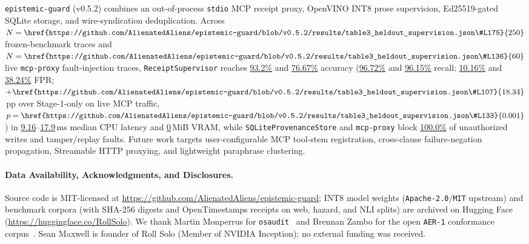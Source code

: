 \documentclass[10pt,twocolumn]{article}
\begin{document}
\texttt{epistemic-guard} (v0.5.2) combines an out-of-process \texttt{stdio} MCP receipt proxy, OpenVINO INT8 prose supervision, Ed25519-gated SQLite storage, and wire-syndication deduplication. Across $N=\href{https://github.com/AlienatedAliens/epistemic-guard/blob/v0.5.2/results/table3_heldout_supervision.json\#L175}{250}$ frozen-benchmark traces and $N=\href{https://github.com/AlienatedAliens/epistemic-guard/blob/v0.5.2/results/table3_heldout_supervision.json\#L136}{60}$ live \texttt{mcp-proxy} fault-injection traces, \texttt{ReceiptSupervisor} reaches \href{https://github.com/AlienatedAliens/epistemic-guard/blob/v0.5.2/results/table3_heldout_supervision.json\#L71}{93.2\%} and \href{https://github.com/AlienatedAliens/epistemic-guard/blob/v0.5.2/results/table3_heldout_supervision.json\#L108}{76.67\%} accuracy (\href{https://github.com/AlienatedAliens/epistemic-guard/blob/v0.5.2/results/table3_heldout_supervision.json\#L96}{96.72\%} and \href{https://github.com/AlienatedAliens/epistemic-guard/blob/v0.5.2/results/table3_heldout_supervision.json\#L121}{96.15\%} recall; \href{https://github.com/AlienatedAliens/epistemic-guard/blob/v0.5.2/results/table3_heldout_supervision.json\#L83}{10.16\%} and \href{https://github.com/AlienatedAliens/epistemic-guard/blob/v0.5.2/results/table3_heldout_supervision.json\#L116}{38.24\%} FPR; $+\href{https://github.com/AlienatedAliens/epistemic-guard/blob/v0.5.2/results/table3_heldout_supervision.json\#L107}{18.34}$\,pp over Stage-1-only on live MCP traffic, $p=\href{https://github.com/AlienatedAliens/epistemic-guard/blob/v0.5.2/results/table3_heldout_supervision.json\#L133}{0.001}$) in \href{https://github.com/AlienatedAliens/epistemic-guard/blob/v0.5.2/results/table3_heldout_supervision.json\#L117}{9.16}--\href{https://github.com/AlienatedAliens/epistemic-guard/blob/v0.5.2/results/table3_heldout_supervision.json\#L86}{17.9}\,ms median CPU latency and \href{https://github.com/AlienatedAliens/epistemic-guard/blob/v0.5.2/results/table3_heldout_supervision.json\#L84}{0}\,MiB VRAM, while \texttt{SQLiteProvenanceStore} and \texttt{mcp-proxy} block \href{https://github.com/AlienatedAliens/epistemic-guard/blob/v0.5.2/results/table2_conformance.json\#L60}{100.0\%} of unauthorized writes and tamper/replay faults. Future work targets user-configurable MCP tool-stem registration, cross-clause failure-negation propagation, Streamable HTTP proxying, and lightweight paraphrase clustering.

\paragraph{Data Availability, Acknowledgments, and Disclosures.}
{\sloppy Source code is MIT-licensed at \url{https://github.com/AlienatedAliens/epistemic-guard}; INT8 model weights (\texttt{Apache-2.0}/\texttt{MIT} upstream) and benchmark corpora (with SHA-256 digests and OpenTimestamps receipts on web, hazard, and NLI splits) are archived on Hugging Face (\url{https://huggingface.co/RollSolo}). We thank Martin Monperrus for \texttt{osaudit}~\cite{monperrus2026osaudit} and Brennan Zambo for the open \texttt{AER-1} conformance corpus~\cite{zambo2026aer1}. Sean Maxwell is founder of Roll Solo (Member of NVIDIA Inception); no external funding was received.\par}

{\small\raggedright


}
\end{document}
